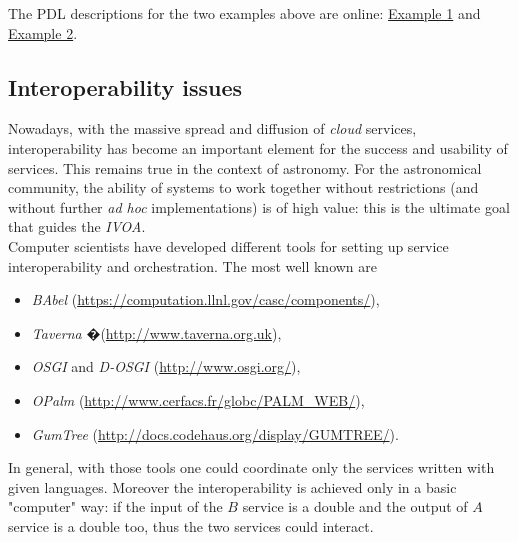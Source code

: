\documentclass[a4paper,11pt] {ivoa}
\begin{document}
 The PDL descriptions for the two examples above are online:  \href{http://vo-param.googlecode.com/svn/trunk/model/documentation/PDL-Description_example01.xml}{Example 1} and \href{http://vo-param.googlecode.com/svn/trunk/model/documentation/PDL-Description_Example02.xml}{Example 2}.


\subsection{Interoperability issues}
Nowadays, with the massive spread and diffusion of {\it cloud} services, interoperability has become
an important element for the success and usability of services. This remains true in the context of
astronomy.
For the astronomical community, the ability of systems to work together without restrictions (and
without further {\it ad hoc} implementations) is of high value: this is the ultimate goal
that guides the {\it IVOA}.\\

Computer scientists have developed different tools for setting up service interoperability and
orchestration. The most well known are
\begin{itemize}
\item {\it BAbel} (\href{https://computation.llnl.gov/casc/components/}{https://computation.llnl.gov/casc/components/}),
\item {\it Taverna }�(\href{http://www.taverna.org.uk}{http://www.taverna.org.uk}),
\item {\it OSGI} and {\it D-OSGI } (\href{http://www.osgi.org/}{http://www.osgi.org/}),
\item {\it OPalm} (\href{http://www.cerfacs.fr/globc/PALM_WEB/}{http://www.cerfacs.fr/globc/PALM\_WEB/}),
\item {\it GumTree} (\href{http://docs.codehaus.org/display/GUMTREE/}{http://docs.codehaus.org/display/GUMTREE/}).
\end{itemize}
In general, with those tools one could coordinate only the services written with given languages.
Moreover the interoperability is achieved only in a basic "computer" way: if the input of the $B$
service is a double and the output of $A$ service is a double too, thus the two services could
interact.\\
\end{document}

